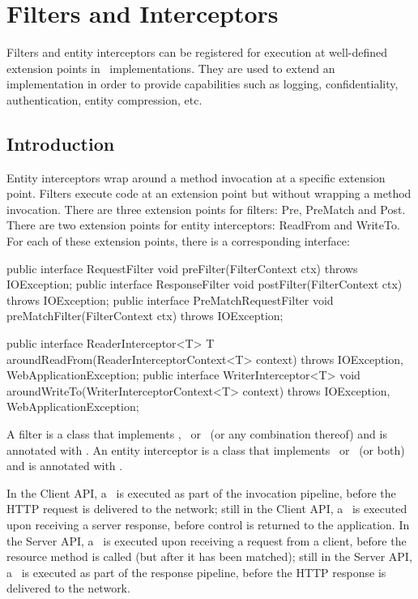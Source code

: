 \chapter{Filters and Interceptors}
\label{filters_and_interceptors}

Filters and entity interceptors can be registered for execution at well-defined extension points in \jaxrs\ implementations. They are used to extend an implementation in order to provide capabilities such as logging, confidentiality, authentication, entity compression, etc. 

\section{Introduction}
\label{introduction_filters}
Entity interceptors wrap around a method invocation at a specific extension point. 
Filters execute code at an extension point but without wrapping a method invocation.  There are three extension points for filters: Pre, PreMatch and Post. There are two extension points for entity interceptors: ReadFrom and WriteTo.  For each of these extension points, there is a corresponding interface:

\begin{listing}{1}
public interface RequestFilter {
    void preFilter(FilterContext ctx) throws IOException;
}
public interface ResponseFilter {
    void postFilter(FilterContext ctx) throws IOException;
}
public interface PreMatchRequestFilter {
    void preMatchFilter(FilterContext ctx) throws IOException;
}
\end{listing}

\begin{listing}{1}
public interface ReaderInterceptor<T> {
    T aroundReadFrom(ReaderInterceptorContext<T> context) 
        throws IOException, WebApplicationException;
}
public interface WriterInterceptor<T> {
    void aroundWriteTo(WriterInterceptorContext<T> context) 
        throws IOException, WebApplicationException;
}
\end{listing}

A filter is a class that implements \RequestFilter, \PreMatchRequestFilter\ or \ResponseFilter\ (or any combination thereof) and is annotated with \Provider. An entity interceptor is a class that implements \ReaderInterceptor\ or \WriterInterceptor\ (or both) and is annotated with \Provider. 

In the Client API, a \RequestFilter\ is executed as part of the invocation pipeline, before the HTTP request is delivered to the network; still in the Client API, a \ResponseFilter\ is executed upon receiving a server response, before control is returned to the application. 
In the Server API, a \RequestFilter\ is executed upon receiving a request from a client, before the resource method is called (but after it has been matched); still in the Server API, a \ResponseFilter\ is executed as part of the response pipeline, before the HTTP response is delivered to the network.

